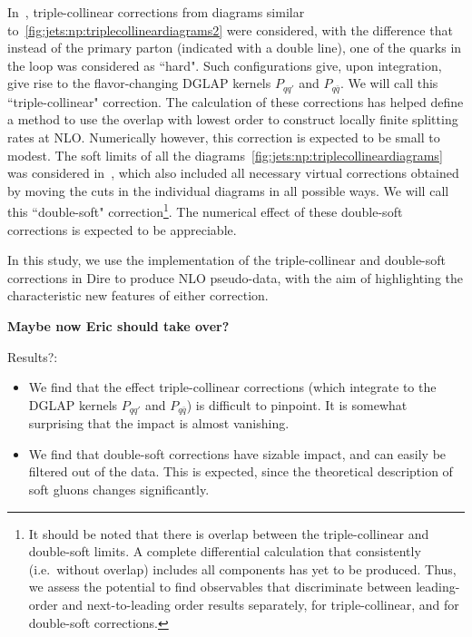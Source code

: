 In~\cite{Hoche:2017iem}, triple-collinear corrections from diagrams
similar to~\ref{fig:jets:np:triplecollineardiagrams2} were considered, with
the difference that instead of the primary parton (indicated with a double 
line), one of the quarks in the loop was considered as ``hard". Such
configurations give, upon integration, give rise to the flavor-changing 
DGLAP kernels $P_{qq'}$ and $P_{q\bar q}$. We will call this 
``triple-collinear" correction. The calculation of these corrections has
helped define a method to use the overlap with lowest order to construct 
locally finite splitting rates at NLO. Numerically however, this correction is 
expected to be small to modest.
The soft limits of all the diagrams~\ref{fig:jets:np:triplecollineardiagrams}
was considered in~\cite{Dulat:2018vuy}, which also included all necessary 
virtual corrections obtained by moving the cuts in the individual diagrams in 
all possible ways. We will call this ``double-soft" correction\footnote{
It should be noted that there is overlap between the
triple-collinear and double-soft limits. A complete differential calculation 
that consistently (i.e.\ without overlap) includes all components has yet
to be produced. Thus, we assess the potential to find observables
that discriminate between leading-order and next-to-leading order
results separately, for triple-collinear, and for double-soft corrections.}. 
The numerical effect of these double-soft corrections is expected to be appreciable.

In this study, we use the implementation of the triple-collinear and 
double-soft corrections in Dire to produce NLO pseudo-data, with the aim
of highlighting the characteristic new features of either correction.

\vspace*{3ex}
{\bf Maybe now Eric should take over?}
\vspace*{3ex}

Results?:
\begin{itemize}
\item We find that the effect triple-collinear corrections (which integrate to
the DGLAP kernels $P_{qq'}$ and $P_{q\bar q}$) is difficult to pinpoint. 
It is somewhat surprising that the impact is almost vanishing.
\item We find that double-soft corrections have sizable impact, and can
easily be filtered out of the data. This is expected, since the theoretical
description of soft gluons changes significantly.
\end{itemize}

